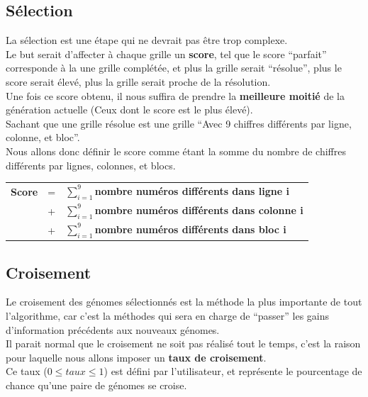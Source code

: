         \subsection{Sélection}
            La sélection est une étape qui ne devrait pas être trop complexe.\\
            Le but serait d'affecter à chaque grille un \textbf{score}, tel que le score ``parfait'' corresponde à la une grille complétée, et plus la grille serait ``résolue'', plus le score serait élevé, plus la grille serait proche de la résolution.\\

            Une fois ce score obtenu, il nous suffira de prendre la \textbf{meilleure moitié} de la génération actuelle (Ceux dont le score est le plus élevé).\\

            Sachant que une grille résolue est une grille ``Avec 9 chiffres différents par ligne, colonne, et bloc''.\\
            Nous allons donc définir le score comme étant la somme du nombre de chiffres différents par lignes, colonnes, et blocs.

            \begin{center}
                \begin{tabular}{rcl}
                    \textbf{Score}&=&$\sum_{i=1}^9$\textbf{nombre numéros différents dans ligne i}\\
                        &+&$\sum_{i=1}^9$\textbf{nombre numéros différents dans colonne i}\\
                        &+&$\sum_{i=1}^9$\textbf{nombre numéros différents dans bloc i}
                \end{tabular}
            \end{center}
        \subsection{Croisement}
            Le croisement des génomes sélectionnés est la méthode la plus importante de tout l'algorithme, car c'est la méthodes qui sera en charge de ``passer'' les gains d'information précédents aux nouveaux génomes.\\
            Il parait normal que le croisement ne soit pas réalisé tout le temps, c'est la raison pour laquelle nous allons imposer un \textbf{taux de croisement}.\\
            Ce taux ($0\leq taux\leq 1$) est défini par l'utilisateur, et représente le pourcentage de chance qu'une paire de génomes se croise.\\

